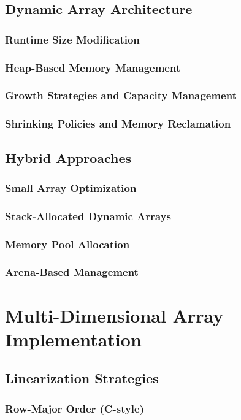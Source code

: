 \documentclass[12pt, oneside]{book}
\begin{document}
\subsection{Dynamic Array Architecture}
\subsubsection{Runtime Size Modification}
\subsubsection{Heap-Based Memory Management}
\subsubsection{Growth Strategies and Capacity Management}
\subsubsection{Shrinking Policies and Memory Reclamation}

\subsection{Hybrid Approaches}
\subsubsection{Small Array Optimization}
\subsubsection{Stack-Allocated Dynamic Arrays}
\subsubsection{Memory Pool Allocation}
\subsubsection{Arena-Based Management}

\section{Multi-Dimensional Array Implementation}
\subsection{Linearization Strategies}
\subsubsection{Row-Major Order (C-style)}
\end{document}
